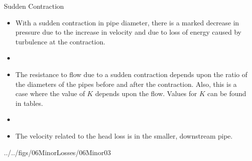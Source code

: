 \documentclass[9pt,xcolor={svgnames, x11names},professionalfonts, mathserif]{beamer}
\begin{document}

\begin{frame}{Sudden Contraction}

 \begin{itemize}

  \item With a sudden contraction in pipe diameter, there is a marked decrease in pressure due to the increase in
        velocity and due to loss of energy caused by turbulence at the contraction.
  \item []
  \item The resistance to flow due to a sudden contraction depends upon the ratio of the diameters of the pipes
        before and after the contraction. Also, this is a case where the value of $K$ depends upon the flow. Values for $K$
        can be found in tables.
  \item []
  \item The velocity related to the head loss is in the smaller, downstream pipe.

 \end{itemize}
 \begin{cfig}[0.35]{../../figs/06MinorLosses/06Minor03}\end{cfig}

\end{frame}

\end{document}
